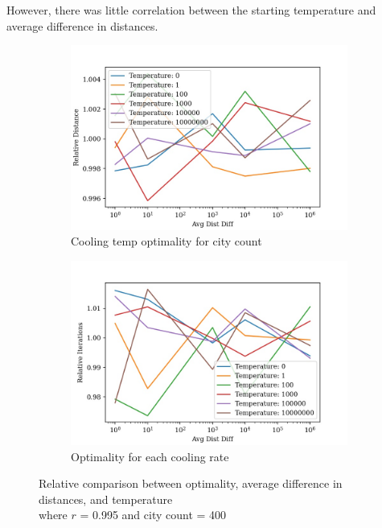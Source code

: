 \documentclass{article}
\begin{document}
However, there was little correlation between the starting temperature and average difference in distances.


\begin{figure}[H]
    \centering
    \begin{subfigure}{0.5\textwidth}
        \centering
        \includegraphics[width=1\linewidth]{images/rand_temperature_avg_dist_diff_distance_relative_400.jpg}
        \caption{Cooling temp optimality for city count}
        \label{fig:sub1}
    \end{subfigure}%
    \begin{subfigure}{0.5\textwidth}
        \centering
        \includegraphics[width=1\linewidth]{images/rand_temperature_avg_dist_diff_iterations_relative_400.jpg}
        \caption{Optimality for each cooling rate}
        \label{fig:sub2}
    \end{subfigure}
    \captionsetup{justification=centering}
    \caption{Relative comparison between optimality, average difference in distances, and temperature \\ where $r$ = 0.995 and city count = 400}
\end{figure}
\end{document}
